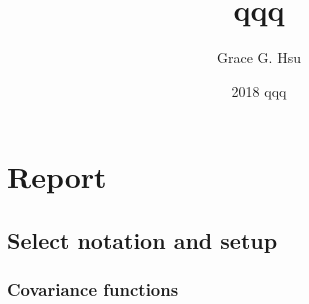 \documentclass{sfuthesis}
\title{qqq}
\author{Grace G. Hsu}
\date{2018 qqq}
\begin{document}
\raggedright

\frontmatter
\maketitle{}
\makecommittee{}


%
%
%
%

%
\tableofcontents%
\clearpage

%





%
%

\mainmatter%



\chapter{Report}

\section{Select notation and setup}


\subsection{Covariance functions}
\end{document}
